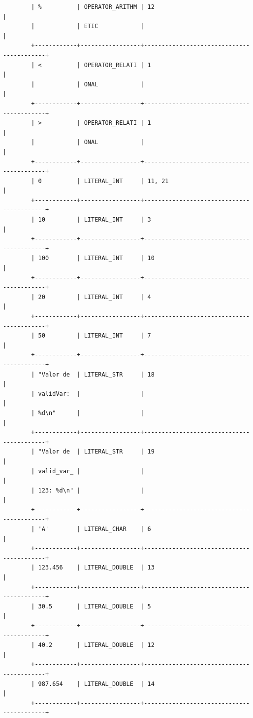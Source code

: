 \documentclass[a4paper,12pt]{article}
\begin{document}
\begin{flushleft}
\begin{verbatim}
		| %          | OPERATOR_ARITHM | 12                                       |
		|            | ETIC            |                                          |
		+------------+-----------------+------------------------------------------+
		| <          | OPERATOR_RELATI | 1                                        |
		|            | ONAL            |                                          |
		+------------+-----------------+------------------------------------------+
		| >          | OPERATOR_RELATI | 1                                        |
		|            | ONAL            |                                          |
		+------------+-----------------+------------------------------------------+
		| 0          | LITERAL_INT     | 11, 21                                   |
		+------------+-----------------+------------------------------------------+
		| 10         | LITERAL_INT     | 3                                        |
		+------------+-----------------+------------------------------------------+
		| 100        | LITERAL_INT     | 10                                       |
		+------------+-----------------+------------------------------------------+
		| 20         | LITERAL_INT     | 4                                        |
		+------------+-----------------+------------------------------------------+
		| 50         | LITERAL_INT     | 7                                        |
		+------------+-----------------+------------------------------------------+
		| "Valor de  | LITERAL_STR     | 18                                       |
		| validVar:  |                 |                                          |
		| %d\n"      |                 |                                          |
		+------------+-----------------+------------------------------------------+
		| "Valor de  | LITERAL_STR     | 19                                       |
		| valid_var_ |                 |                                          |
		| 123: %d\n" |                 |                                          |
		+------------+-----------------+------------------------------------------+
		| 'A'        | LITERAL_CHAR    | 6                                        |
		+------------+-----------------+------------------------------------------+
		| 123.456    | LITERAL_DOUBLE  | 13                                       |
		+------------+-----------------+------------------------------------------+
		| 30.5       | LITERAL_DOUBLE  | 5                                        |
		+------------+-----------------+------------------------------------------+
		| 40.2       | LITERAL_DOUBLE  | 12                                       |
		+------------+-----------------+------------------------------------------+
		| 987.654    | LITERAL_DOUBLE  | 14                                       |
		+------------+-----------------+------------------------------------------+
	\end{verbatim}
\end{flushleft}
\end{document}
